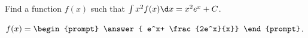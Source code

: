 \documentclass{ximera}
\author{Jim Talamo}
\begin{document}
\begin{exercise}
Find a function $f(x)$ such that $\int x^2 f(x) \d x = x^2 e^x +C$. 

$f(x) = \begin{prompt} \answer{ e^x+ \frac{2e^x}{x}} \end{prompt}$.


\end{exercise}
\end{document}
